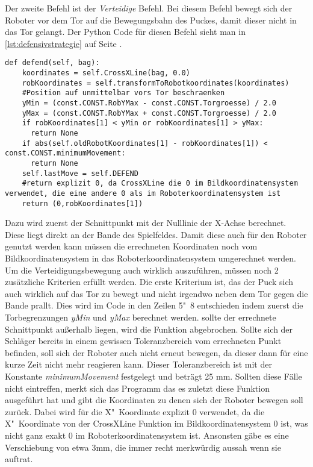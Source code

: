 Der zweite Befehl ist der \textit{Verteidige} Befehl. Bei diesem Befehl bewegt sich der Roboter vor dem Tor auf die Bewegungsbahn des Puckes, damit dieser nicht in das Tor gelangt. Der Python Code für diesen Befehl sieht man in \ref{lst:defensivstrategie} auf Seite \pageref{lst:defensivstrategie}.
\begin{lstlisting}[caption= python-funktion für Defensivstrategie, label=lst:defensivstrategie]
def defend(self, bag):
	koordinates = self.CrossXLine(bag, 0.0)
	robKoordinates = self.transformToRobotkoordinates(koordinates)
	#Position auf unmittelbar vors Tor beschraenken
	yMin = (const.CONST.RobYMax - const.CONST.Torgroesse) / 2.0
	yMax = (const.CONST.RobYMax + const.CONST.Torgroesse) / 2.0
	if robKoordinates[1] < yMin or robKoordinates[1] > yMax:
	  return None
	if abs(self.oldRobotKoordinates[1] - robKoordinates[1]) < const.CONST.minimumMovement:
	  return None
	self.lastMove = self.DEFEND
	#return explizit 0, da CrossXLine die 0 im Bildkoordinatensystem verwendet, die eine andere 0 als im Roboterkoordinatensystem ist
	return (0,robKoordinates[1])
\end{lstlisting}
Dazu wird zuerst der Schnittpunkt mit der Nulllinie der X-Achse berechnet. Diese liegt direkt an der Bande des Spielfeldes. Damit diese auch für den Roboter genutzt werden kann müssen die errechneten Koordinaten noch vom Bildkoordinatensystem in das Roboterkoordinatensystem umgerechnet werden. Um die Verteidigungsbewegung auch wirklich auszuführen, müssen noch 2 zusätzliche Kriterien erfüllt werden. Die erste Kriterium ist, das der Puck sich auch wirklich auf das Tor zu bewegt und nicht irgendwo neben dem Tor gegen die Bande prallt. Dies wird im Code in den Zeilen 5"~8 entschieden indem zuerst die Torbegrenzungen  \textit{yMin} und \textit{yMax} berechnet werden. sollte der errechnete Schnittpunkt außerhalb liegen, wird die Funktion abgebrochen. Sollte sich der Schläger bereits in einem gewissen Toleranzbereich vom errechneten Punkt befinden, soll sich der Roboter auch nicht erneut bewegen, da dieser dann für eine kurze Zeit nicht mehr reagieren kann. Dieser Toleranzbereich ist mit der Konstante \textit{minimumMovement} festgelegt und beträgt 25 mm. Sollten diese Fälle nicht eintreffen, merkt sich das Programm das es zuletzt diese Funktion ausgeführt hat und gibt die Koordinaten zu denen sich der Roboter bewegen soll zurück. Dabei wird für die X"~Koordinate explizit 0 verwendet, da die X"~Koordinate von der CrossXLine Funktion im Bildkoordinatensystem 0 ist, was nicht ganz exakt 0 im Roboterkoordinatensystem ist. Ansonsten gäbe es eine Verschiebung von etwa 3mm, die immer recht merkwürdig aussah wenn sie auftrat.


